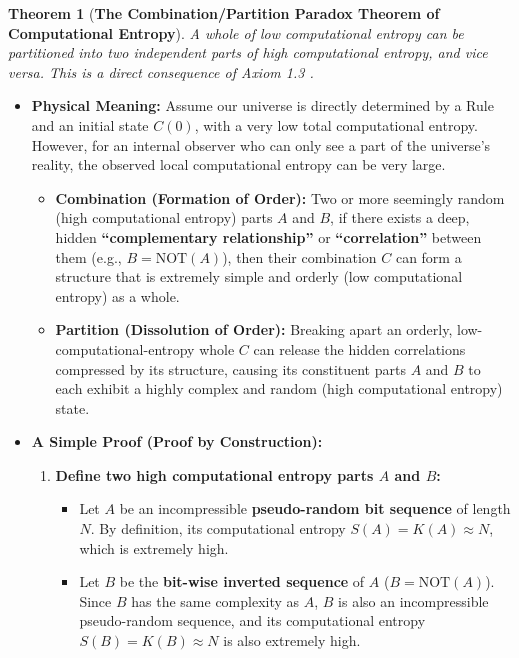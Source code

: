 \documentclass[11pt, a4paper]{article}
\newtheorem{theorem}{Theorem}[section]
\begin{document}
\begin{theorem}[\textbf{The Combination/Partition Paradox Theorem of Computational Entropy}]
A whole of low computational entropy can be partitioned into two independent parts of high computational entropy, and vice versa. This is a direct consequence of Axiom 1.3 \cite{Kolmogorov1965}.
\end{theorem}
\begin{itemize}
    \item \textbf{Physical Meaning:} Assume our universe is directly determined by a Rule and an initial state $C(0)$, with a very low total computational entropy. However, for an internal observer who can only see a part of the universe's reality, the observed local computational entropy can be very large.
    \begin{itemize}
        \item \textbf{Combination (Formation of Order):} Two or more seemingly random (high computational entropy) parts $A$ and $B$, if there exists a deep, hidden \textbf{``complementary relationship''} or \textbf{``correlation''} between them (e.g., $B = \text{NOT}(A)$), then their combination $C$ can form a structure that is extremely simple and orderly (low computational entropy) as a whole.
        \item \textbf{Partition (Dissolution of Order):} Breaking apart an orderly, low-computational-entropy whole $C$ can release the hidden correlations compressed by its structure, causing its constituent parts $A$ and $B$ to each exhibit a highly complex and random (high computational entropy) state.
    \end{itemize}
    \item \textbf{A Simple Proof (Proof by Construction):}
    \begin{enumerate}
        \item \textbf{Define two high computational entropy parts $A$ and $B$:}
            \begin{itemize}
                \item Let $A$ be an incompressible \textbf{pseudo-random bit sequence} of length $N$. By definition, its computational entropy $S(A) = K(A) \approx N$, which is extremely high.
                \item Let $B$ be the \textbf{bit-wise inverted sequence} of $A$ ($B = \text{NOT}(A)$). Since $B$ has the same complexity as $A$, $B$ is also an incompressible pseudo-random sequence, and its computational entropy $S(B) = K(B) \approx N$ is also extremely high.
            \end{itemize}

\end{enumerate}
\end{itemize}
\end{document}
